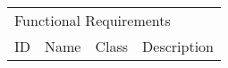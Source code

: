 
\begin{longtable}{l p{3cm} p{0.8cm} p{8.5cm} }
\multicolumn{4}{l}{Functional Requirements}       
                                                                                                                                                                                                                              \\
ID                      & Name                                    & Class  & Description                                                                                                                                                                                                                         \\ \hline





\end{longtable}
